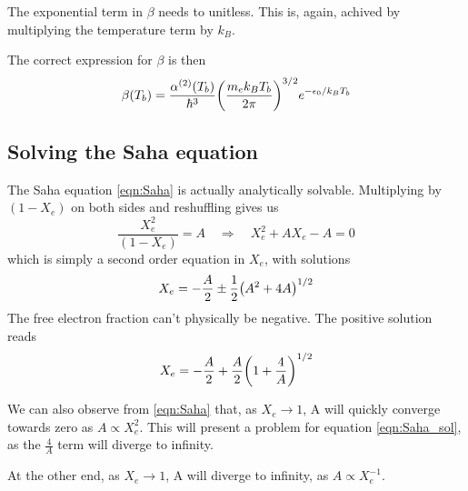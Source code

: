 \documentclass[10pt, a4paper]{article}
\begin{document}
The exponential term in $\beta$ needs to unitless. This is, again, achived by multiplying the temperature term by $k_B$.

The correct expression for $\beta$ is then
\begin{equation*}
    \beta\qty(T_{b}) =\frac{\alpha^{(2)}\qty(T_{b})}{\hbar^3}\qty(\frac{m_{e} k_B T_{b}}{2 \pi})^{3 / 2} e^{-\epsilon_{0} / k_BT_{b}}
\end{equation*}


\subsection{Solving the Saha equation}
The Saha equation \ref{eqn:Saha} is actually analytically solvable. Multiplying by $(1-X_e)$ on both sides and reshuffling gives us
\begin{equation*}
    \frac{X_e^2}{(1-X_e)} = A \quad \Rightarrow \quad X_e^2 + AX_e - A = 0
\end{equation*}
which is simply a second order equation in $X_e$, with solutions
\begin{equation*}
    X_e = - \frac{A}{2} \pm \frac{1}{2}\qty(A^2 + 4A)^{1/2}
\end{equation*}
The free electron fraction can't physically be negative. The positive solution reads
\begin{equation}\label{eqn:Saha_sol}
    X_e = - \frac{A}{2} + \frac{A}{2}\qty(1 + \frac{4}{A})^{1/2}
\end{equation}

We can also observe from \ref{eqn:Saha} that, as $X_e \rightarrow 1$, A will quickly converge towards zero as $A \propto X_e^2$. This will present a problem for equation \ref{eqn:Saha_sol}, as the $\frac{4}{A}$ term will diverge to infinity.

At the other end, as $X_e \rightarrow 1$, A will diverge to infinity, as $A \propto X_e^{-1}$.




\end{document}
